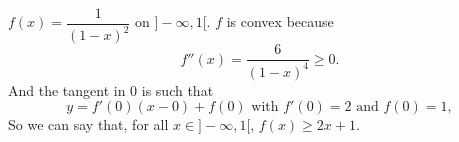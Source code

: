 \documentclass[a4paper,11pt]{article}
\begin{document}
$f(x)= \dfrac{1}{(1-x)^2}$ on $]-\infty, 1[$.
$f$ is convex because
\[ f''(x) = \frac{6}{(1-x)^4} \geq 0. \]
And the tangent in 0 is such that
\[ y=f'(0)(x-0) + f(0) \text{ with } f'(0)=2 \text{ and } f(0)=1, \]
So we can say that, for all $x \in ]-\infty, 1[$,
$f(x) \geq 2x+1$.
\end{document}

